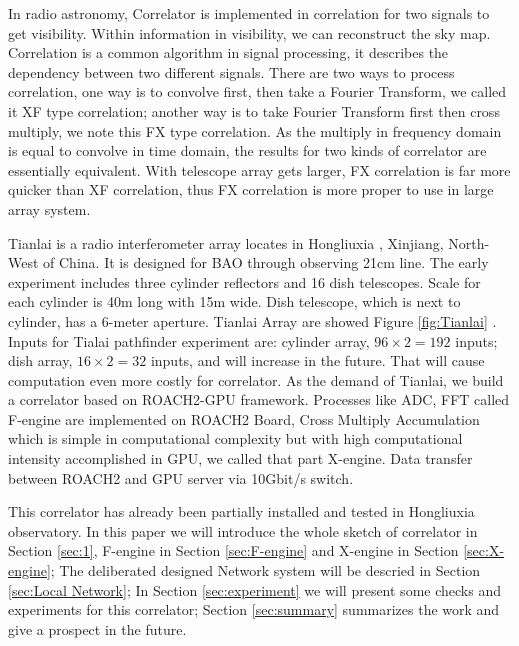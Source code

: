 \documentclass{ws-jai}
\begin{document}
	In radio astronomy, Correlator is implemented in correlation for two signals to get visibility. Within information in visibility, we can reconstruct the sky map\cite{1986isra.book.....T}. Correlation is a common algorithm in signal processing, it describes the dependency between two different signals. There are two ways to process correlation, one way is to convolve first, then take a Fourier Transform, we called it XF type correlation; another way is to take Fourier Transform first then cross multiply, we note this FX type correlation. As the multiply in frequency domain is equal to convolve in time domain, the results for two kinds of correlator are essentially equivalent. With telescope array gets larger, FX correlation is far more quicker than XF correlation\cite{2016JAI.....502002P}, thus FX correlation is more proper to use in large array system.
	 
	Tianlai is a radio interferometer array locates in Hongliuxia , Xinjiang, North-West of China\cite{2012IJMPS..12..256C}. It is designed for BAO through observing 21cm line. The early experiment includes three cylinder reflectors and 16 dish telescopes. Scale for each cylinder is 40m long with 15m wide. Dish telescope, which is next to cylinder, has a 6-meter aperture. Tianlai Array are showed Figure \ref{fig:Tianlai} . Inputs for Tialai  pathfinder experiment are: cylinder array, $96\times2=192$ inputs;  dish array, $16\times2=32$ inputs, and will increase in the future. That will cause computation even more costly for correlator. As the demand of Tianlai, we build a correlator based on ROACH2-GPU framework. Processes like ADC, FFT called F-engine are implemented on ROACH2 Board, Cross Multiply Accumulation  which is simple in computational complexity but with high computational intensity accomplished in GPU, we called that part X-engine. Data transfer between ROACH2 and GPU server via 10Gbit/s switch.

	This correlator has already been partially installed and tested in Hongliuxia observatory. In this paper we will introduce the whole sketch of correlator in Section \ref{sec:1}, F-engine in Section \ref{sec:F-engine} and X-engine in Section \ref{sec:X-engine}; The deliberated designed Network system will be descried in Section \ref{sec:Local Network}; In Section \ref{sec:experiment} we will present some checks and experiments for this correlator; Section \ref{sec:summary} summarizes the work and give a prospect in the future.
\end{document}
